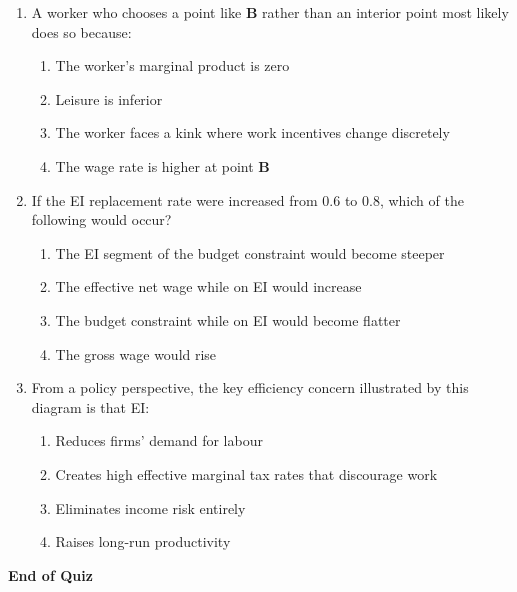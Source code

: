 \documentclass[11pt]{article}
\begin{document}
\begin{enumerate}
\item A worker who chooses a point like \textbf{B} rather than an interior point most likely does so because:

\begin{enumerate}
\item The worker’s marginal product is zero  
\item Leisure is inferior  
\item The worker faces a kink where work incentives change discretely  
\item The wage rate is higher at point \textbf{B}  
\end{enumerate}

\newpage
\item If the EI replacement rate were increased from 0.6 to 0.8, which of the following would occur?

\begin{enumerate}
\item The EI segment of the budget constraint would become steeper  
\item The effective net wage while on EI would increase  
\item The budget constraint while on EI would become flatter  
\item The gross wage would rise  
\end{enumerate}

\item From a policy perspective, the key efficiency concern illustrated by this diagram is that EI:

\begin{enumerate}
\item Reduces firms’ demand for labour  
\item Creates high effective marginal tax rates that discourage work  
\item Eliminates income risk entirely  
\item Raises long-run productivity  
\end{enumerate}

\end{enumerate}

\vfill
\textbf{End of Quiz}
\end{document}
